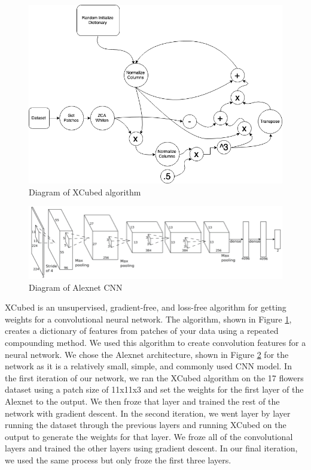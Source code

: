 \documentclass{article}
\begin{document}
\begin{figure}
    \centering
    \includegraphics[width=.8\linewidth]{XCubed_diagram}
    \caption{Diagram of XCubed algorithm}
    \label{fig:diagram}
\end{figure}
\begin{figure}
    \centering
    \includegraphics[width=.8\linewidth]{Alexnet_diagram}
    \caption{Diagram of Alexnet CNN}
    \label{fig:alex}
\end{figure}
XCubed is an unsupervised, gradient-free, and loss-free algorithm for getting weights for a convolutional neural network. The algorithm, shown in Figure \ref{fig:diagram}, creates a dictionary of features from patches of your data using a repeated compounding method. We used this algorithm to create convolution features for a neural network. We chose the Alexnet\cite{alexnet} architecture, shown in Figure \ref{fig:alex} for the network as it is a relatively small, simple, and commonly used CNN model\cite{something}. In the first iteration of our network, we ran the XCubed algorithm on the 17 flowers dataset using a patch size of 11x11x3 and set the weights for the first layer of the Alexnet to the output. We then froze that layer and trained the rest of the network with gradient descent. In the second iteration, we went layer by layer running the dataset through the previous layers and running XCubed on the output to generate the weights for that layer. We froze all of the convolutional layers and trained the other layers using gradient descent. In our final iteration, we used the same process but only froze the first three layers.
\end{document}
